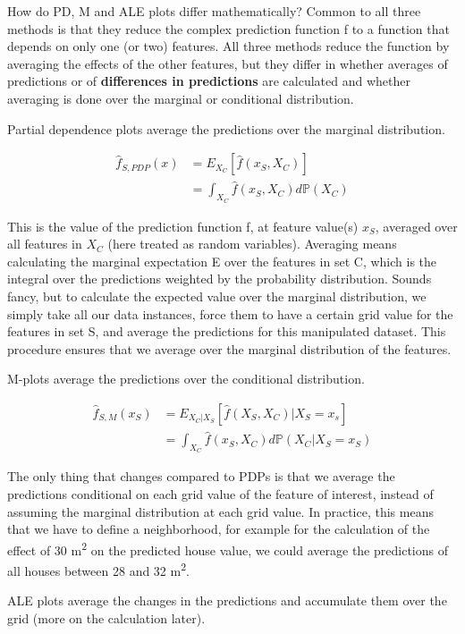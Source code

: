 \documentclass[
  10pt,
]{scrbook}
\begin{document}
How do PD, M and ALE plots differ mathematically?
Common to all three methods is that they reduce the complex prediction function f to a function that depends on only one (or two) features.
All three methods reduce the function by averaging the effects of the other features, but they differ in whether averages of predictions or of \textbf{differences in predictions} are calculated and whether averaging is done over the marginal or conditional distribution.

Partial dependence plots average the predictions over the marginal distribution.

\begin{align*}
\hat{f}_{S,PDP}(x)&=E_{X_C}\left[\hat{f}(x_S,X_C)\right] \\
& = \int_{X_C}\hat{f}(x_S,X_C)d\mathbb{P}(X_C)
\end{align*}

This is the value of the prediction function f, at feature value(s) \(x_S\), averaged over all features in \(X_C\) (here treated as random variables).
Averaging means calculating the marginal expectation E over the features in set C, which is the integral over the predictions weighted by the probability distribution.
Sounds fancy, but to calculate the expected value over the marginal distribution, we simply take all our data instances, force them to have a certain grid value for the features in set S, and average the predictions for this manipulated dataset.
This procedure ensures that we average over the marginal distribution of the features.

M-plots average the predictions over the conditional distribution.

\begin{align*}\hat{f}_{S,M}(x_S)&=E_{X_C|X_S}\left[\hat{f}(X_S,X_C)|X_S=x_s\right]\\&=\int_{X_C}\hat{f}(x_S, X_C)d\mathbb{P}(X_C|X_S = x_S)\end{align*}

The only thing that changes compared to PDPs is that we average the predictions conditional on each grid value of the feature of interest, instead of assuming the marginal distribution at each grid value.
In practice, this means that we have to define a neighborhood, for example for the calculation of the effect of 30 m\textsuperscript{2} on the predicted house value, we could average the predictions of all houses between 28 and 32 m\textsuperscript{2}.

ALE plots average the changes in the predictions and accumulate them over the grid (more on the calculation later).
\end{document}

